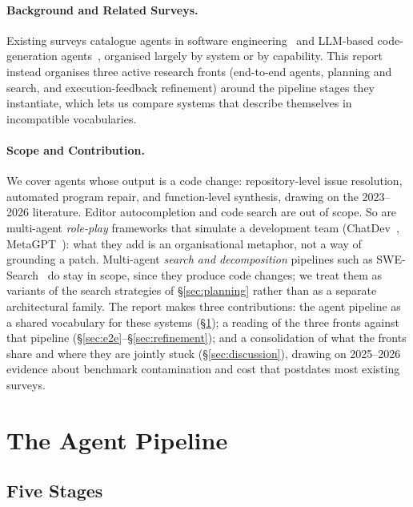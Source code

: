 \documentclass[
  english,        %
  font=times,     %
  twocolumn,      %
]{tumarticle}
\begin{document}
\paragraph{Background and Related Surveys.}
Existing surveys catalogue agents in software engineering~\cite{wang2024agentsse}
and LLM-based code-generation agents~\cite{dong2025surveycodegen}, organised
largely by system or by capability. This report instead organises three active
research fronts (end-to-end agents, planning and search, and execution-feedback
refinement) around the pipeline stages they instantiate, which lets us compare
systems that describe themselves in incompatible vocabularies.

\paragraph{Scope and Contribution.}
We cover agents whose output is a code change: repository-level issue
resolution, automated program repair, and function-level synthesis, drawing on
the 2023--2026 literature. Editor autocompletion and code search are out of
scope. So are multi-agent \emph{role-play} frameworks that simulate a development
team (ChatDev~\cite{qian2024chatdev}, MetaGPT~\cite{hong2024metagpt}): what they
add is an organisational metaphor, not a way of grounding a patch. Multi-agent
\emph{search and decomposition} pipelines such as
SWE-Search~\cite{antoniades2024swesearch} do stay in scope, since they produce
code changes; we treat them as variants of the search strategies of
\S\ref{sec:planning} rather than as a separate architectural family.
The report makes three contributions: the agent pipeline as a shared vocabulary
for these systems (\S\ref{sec:pipeline}); a reading of the three fronts against
that pipeline (\S\ref{sec:e2e}--\S\ref{sec:refinement}); and a consolidation of
what the fronts share and where they are jointly stuck
(\S\ref{sec:discussion}), drawing on 2025--2026 evidence about benchmark
contamination and cost that postdates most existing surveys.

\section{The Agent Pipeline}
\label{sec:pipeline}

\subsection{Five Stages}
\end{document}
